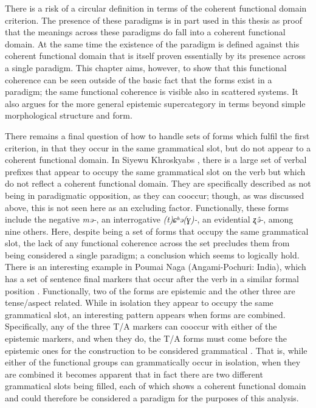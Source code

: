 There is a risk of a circular definition in terms of the coherent functional domain criterion. The presence of these paradigms is in part used in this thesis as proof that the meanings across these paradigms do fall into a coherent functional domain. At the same time the existence of the paradigm is defined against this coherent functional domain that is itself proven essentially by its presence across a single paradigm. This chapter aims, however, to show that this functional coherence can be seen outside of the basic fact that the forms exist in a paradigm; the same functional coherence is visible also in scattered systems. It also argues for the more general epistemic supercategory in terms beyond simple morphological structure and form.

There remains a final question of how to handle sets of forms which fulfil the first criterion, in that they occur in the same grammatical slot, but do not appear to a coherent functional domain. In Siyewu Khroskyabs \cite[rGyalrongic: PRC,][34]{TaylorAdams2020}, there is a large set of verbal prefixes that appear to occupy the same grammatical slot on the verb but which do not reflect a coherent functional domain. They are specifically described as not being in paradigmatic opposition, as they can cooccur; though, as was discussed above, this is not seen here as an excluding factor. Functionally, these forms include the negative \textit{mə-}, an interrogative \textit{(t)ɕʰə(ɣ)-}, an evidential \textit{ʐə̂-}, among nine others. Here, despite being a set of forms that occupy the same grammatical slot, the lack of any functional coherence across the set precludes them from being considered a single paradigm; a conclusion which seems to logically hold. There is an interesting example in Poumai Naga (Angami-Pochuri: India), which has a set of sentence final markers that occur after the verb in a similar formal position \cite{Veikho2021}. Functionally, two of the forms are epistemic and the other three are tense/aspect related. While in isolation they appear to occupy the same grammatical slot, an interesting pattern appears when forms are combined. Specifically, any of the three T/A markers can cooccur with either of the epistemic markers, and when they do, the T/A forms must come before the epistemic ones for the construction to be considered grammatical \cite[278]{Veikho2021}. That is, while either of the functional groups can grammatically occur in isolation, when they are combined it becomes apparent that in fact there are two different grammatical slots being filled, each of which shows a coherent functional domain and could therefore be considered a paradigm for the purposes of this analysis.

